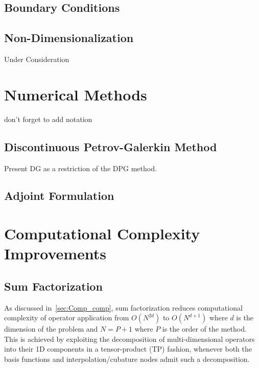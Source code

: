 \documentclass[12pt,Bold,letterpaper,TexShade]{mcgilletdclass}
\numberwithin{equation}{section}
\begin{document}
\section{Boundary Conditions}

\section{Non-Dimensionalization}
{\color{red}Under Consideration}



\chapter{Numerical Methods}
{\color{red} don't forget to add notation}

\section{Discontinuous Petrov-Galerkin Method}
{\color{red} Present DG as a restriction of the DPG method.}

\section{Adjoint Formulation}



\chapter{Computational Complexity Improvements}

\section{Sum Factorization}

As discussed in~\autoref{sec:Comp_comp}, sum factorization reduces computational complexity of operator application from $O(N^{2d})$ to $O(N^{d+1})$ where $d$ is the dimension of the problem and $N = P+1$ where $P$ is the order of the method. This is achieved by exploiting the decomposition of multi-dimensional operators into their 1D components in a tensor-product (TP) fashion, whenever both the basis functions and interpolation/cubature nodes admit such a decomposition. 
\end{document}
